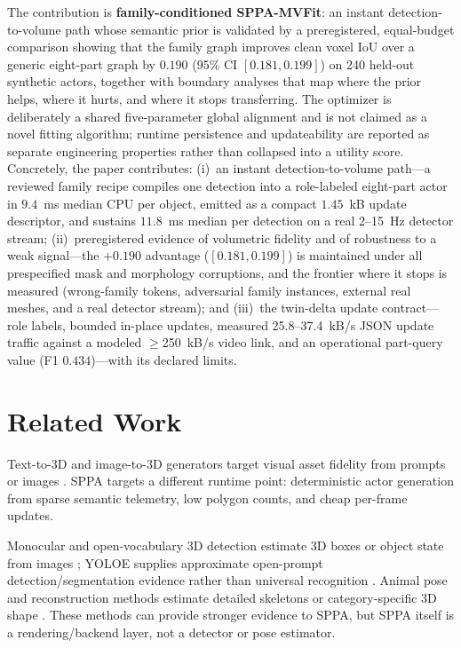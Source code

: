 \documentclass[11pt,a4paper]{article}
\begin{document}
The contribution is \textbf{family-conditioned SPPA-MVFit}: an instant
detection-to-volume path whose semantic prior is validated by a preregistered,
equal-budget comparison showing that the family graph improves clean voxel IoU
over a generic eight-part graph by \(0.190\) (95\% CI \([0.181,0.199]\)) on
240
held-out synthetic actors, together with boundary analyses that map where the
prior helps, where it hurts, and where it stops transferring. The optimizer is
deliberately a shared five-parameter global alignment and is not claimed as a
novel fitting algorithm; runtime persistence and updateability are reported as
separate engineering properties rather than collapsed into a utility score.
Concretely, the paper contributes: (i)~an instant detection-to-volume
path---a reviewed family recipe compiles one detection into a role-labeled
eight-part actor in \(9.4\)~ms median CPU per object, emitted as a compact
\(1.45\)~kB update descriptor, and sustains \(11.8\)~ms median per detection
on a real 2--15~Hz detector stream; (ii)~preregistered evidence of volumetric
fidelity and of robustness to a weak signal---the \(+0.190\) advantage
(\([0.181,0.199]\)) is maintained under all prespecified mask and morphology
corruptions, and the frontier where it stops is measured (wrong-family
tokens, adversarial family instances, external real meshes, and a real
detector stream); and (iii)~the twin-delta update contract---role labels,
bounded in-place updates, measured 25.8--37.4~kB/s JSON update traffic
against a modeled \(\geq\)250~kB/s video link, and an operational part-query
value (F1 \(0.434\))---with its declared limits.

\section{Related Work}

Text-to-3D and image-to-3D generators target visual asset fidelity from prompts
or images
\cite{poole2022dreamfusion,lin2022magic3d,nichol2022pointe,tochilkin2024triposr,triposg2025,xu2024instantmesh,xiang2024trellis,zhao2025hunyuan3d}.
SPPA targets a different runtime point: deterministic actor generation from
sparse semantic telemetry, low polygon counts, and cheap per-frame updates.

Monocular and open-vocabulary 3D detection estimate 3D boxes or object state
from images \cite{brazil2022omni3d,yao2024ovmono3d}; YOLOE supplies approximate
open-prompt detection/segmentation evidence rather than universal recognition
\cite{wang2025yoloe}. Animal pose and
reconstruction methods estimate detailed skeletons or category-specific 3D
shape \cite{yu2021ap10k,li20243dfauna,hu2026sam3danimal}. These methods can
provide stronger evidence to SPPA, but SPPA itself is a rendering/backend layer,
not a detector or pose estimator.
\end{document}
